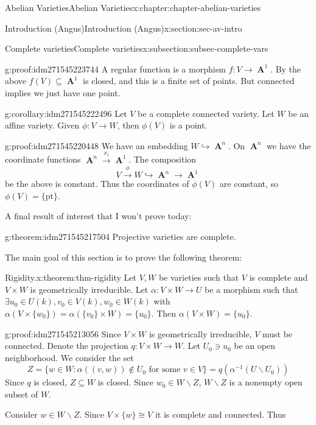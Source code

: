 \documentclass[oneside,10pt,]{book}
\numberwithin{equation}{section}
\DeclareMathOperator{\aff}{\mathbf{A}}
\begin{document}
\begin{chapterptx}{Abelian Varieties}{}{Abelian Varieties}{}{}{x:chapter:chapter-abelian-varieties}
\begin{sectionptx}{Introduction (Angus)}{}{Introduction (Angus)}{}{}{x:section:sec-av-intro}
\begin{subsectionptx}{Complete varieties}{}{Complete varieties}{}{}{x:subsection:subsec-complete-vars}
\begin{proofptx}{}{g:proof:idm271545223744}
A regular function is a morphism \(f\colon V \to \aff^1\). By the above \(f(V) \subseteq \aff^1\) is closed, and this is a finite set of points. But connected implies we just have one point.%
\end{proofptx}
\begin{corollary}{}{}{g:corollary:idm271545222496}%
Let \(V \) be a complete connected variety. Let \(W\) be an affine variety. Given \(\phi\colon V\to W\), then \(\phi (V)\) is a point.%
\end{corollary}
\begin{proofptx}{}{g:proof:idm271545220448}
We have an embedding \(W \hookrightarrow \aff^n\). On \(\aff^n\) we have the coordinate functions \(\aff^n \xrightarrow{x_i} \aff^1\). The composition%
\begin{equation*}
V \xrightarrow\phi W \hookrightarrow\aff^n \to \aff^1
\end{equation*}
be the above is constant. Thus the coordinates of \(\phi(V)\) are constant, so \(\phi(V) = \{\text{pt}\}\).%
\end{proofptx}
A final result of interest that I won't prove today:%
\begin{theorem}{}{}{g:theorem:idm271545217504}%
Projective varieties are complete.%
\end{theorem}
The main goal of this section is to prove the following theorem:%
\begin{theorem}{Rigidity.}{}{x:theorem:thm-rigidity}%
Let \(V,W\) be varieties such that \(V\) is complete and  \(V\times W\) is geometrically irreducible. Let \(\alpha\colon V\times W \to U\) be a morphism such that \(\exists u_0\in U(k), v_0\in V(k), w_0\in W(k)\) with \(\alpha(V\times\{w_0\}) = \alpha (\{v_0\}\times W ) = \{u_0\}\). Then \(\alpha (V\times W) = \{u_0\}\).%
\end{theorem}
\begin{proofptx}{}{g:proof:idm271545213056}
Since \(V\times W\) is geometrically irreducible, \(V\) must be connected. Denote the projection \(q\colon V\times W \to W\). Let \(U_0 \ni u_0\) be an open neighborhood. We consider the set%
\begin{equation*}
Z = \{w\in W : \alpha((v,w)) \not\in U_0 \text{ for some } v\in V\} = q(\alpha^{-1}(U\smallsetminus U_0))
\end{equation*}
Since \(q\) is closed, \(Z\subseteq W\) is closed. Since \(w_0\in W\smallsetminus Z\), \(W\smallsetminus Z\) is a nonempty open subset of \(W\).%
\par
Consider \(w \in W\smallsetminus Z\). Since \(V\times\{w\} \cong V\) it is complete and connected. Thus%

\end{proofptx}
\end{subsectionptx}
\end{sectionptx}
\end{chapterptx}
\end{document}
